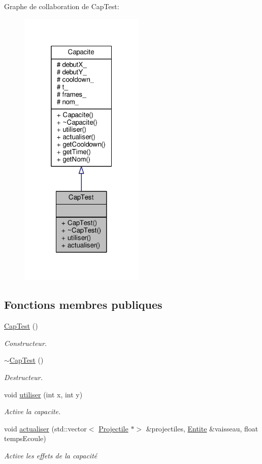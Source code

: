 Graphe de collaboration de Cap\+Test\+:\nopagebreak
\begin{figure}[H]
\begin{center}
\leavevmode
\includegraphics[width=169pt]{class_cap_test__coll__graph}
\end{center}
\end{figure}
\subsection*{Fonctions membres publiques}
\begin{DoxyCompactItemize}
\item 
\hyperlink{class_cap_test_a5f6d4b172a6a40f974b3f7414e3f06e5}{Cap\+Test} ()
\begin{DoxyCompactList}\small\item\em Constructeur. \end{DoxyCompactList}\item 
\hyperlink{class_cap_test_a92687aa212347d1738e7736cb107d03b}{$\sim$\+Cap\+Test} ()
\begin{DoxyCompactList}\small\item\em Destructeur. \end{DoxyCompactList}\item 
void \hyperlink{class_cap_test_a9c85a17dec6cf78f1438b08b175f650d}{utiliser} (int x, int y)
\begin{DoxyCompactList}\small\item\em Active la capacite. \end{DoxyCompactList}\item 
void \hyperlink{class_cap_test_a082e76e397a400b9c46e13e63ac7ef85}{actualiser} (std\+::vector$<$ \hyperlink{class_projectile}{Projectile} $\ast$$>$ \&projectiles, \hyperlink{class_entite}{Entite} \&vaisseau, float temps\+Ecoule)
\begin{DoxyCompactList}\small\item\em Active les effets de la capacité \end{DoxyCompactList}\end{DoxyCompactItemize}
